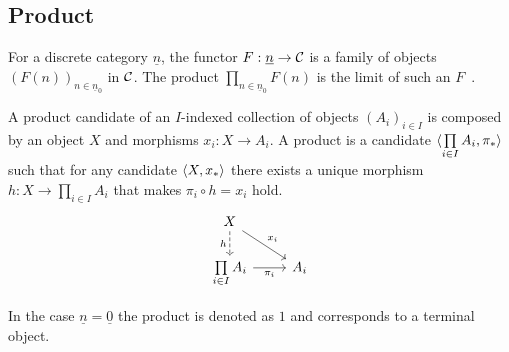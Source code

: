 \subsection{Product}

\begin{definition}[Product]\label{def:product_limit}
	For a discrete category $\underline{n}$, the functor $F:\underline{n}\to \mathcal{C}$
	is a family of objects $(F(n))_{n\in \underline{n}_0}$ in $\mathcal{C}$. The product
	$\prod\limits_{n\in \underline{n}_0} F(n)$ is the limit of such an
	$F$~\parencite[p.~108]{leinster:basic_category_theory}.
\end{definition}

\begin{remark}
	A product candidate of an $I$-indexed collection of objects $(A_i)_{i\in I}$
	is composed by an object $X$ and morphisms $x_i: X \to A_i$. A product is a
	candidate $\langle\prod\limits_{i\in I} A_i, \pi_*\rangle$ such that for any candidate
	$\langle X, x_*\rangle$ there exists a unique morphism $h:X\to \prod\limits_{i\in I} A_i$
	that makes $\pi_i \circ h = x_i$ hold.
	\[\begin{tikzcd}[ampersand replacement=\&]
		X \\
		{\prod\limits_{i\in I} A_i} \& {A_i}
		\arrow["h"', dashed, from=1-1, to=2-1]
		\arrow["{\pi_i}"', from=2-1, to=2-2]
		\arrow["{x_i}", from=1-1, to=2-2]
	\end{tikzcd}\]
\end{remark}

\begin{remark}
	In the case $\underline{n}=\underline{0}$ the product is denoted as $1$
	and corresponds to a terminal object.
\end{remark}

